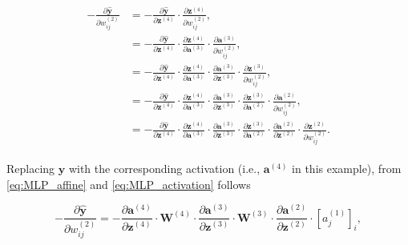 \begin{align}\label{eq:backprop_step2}
\begin{split}
    -\frac{\partial\mathbf{\hat y}}{\partial w_{ij}^{(2)}} &=
        -\frac{\partial \mathbf{\hat y}}{\partial \mathbf{z}^{(4)}} \cdot
        \frac{\partial \mathbf{z}^{(4)}}{\partial w_{ij}^{(2)}} ,\\
    &= -\frac{\partial \mathbf{\hat y}} {\partial \mathbf{z}^{(4)}} \cdot
        \frac{\partial \mathbf{z}^{(4)}}{\partial \mathbf{a}^{(3)}} \cdot
        \frac{\partial \mathbf{a}^{(3)}}{\partial w_{ij}^{(2)}} ,\\
    &= -\frac{\partial \mathbf{\hat y}} {\partial \mathbf{z}^{(4)}} \cdot
        \frac{\partial \mathbf{z}^{(4)}}{\partial \mathbf{a}^{(3)}} \cdot
        \frac{\partial \mathbf{a}^{(3)}}{\partial \mathbf{z}^{(3)}} \cdot
        \frac{\partial \mathbf{z}^{(3)}}{\partial w_{ij}^{(2)}} ,\\
    &= -\frac{\partial \mathbf{\hat y}} {\partial \mathbf{z}^{(4)}} \cdot
        \frac{\partial \mathbf{z}^{(4)}}{\partial \mathbf{a}^{(3)}} \cdot
        \frac{\partial \mathbf{a}^{(3)}}{\partial \mathbf{z}^{(3)}} \cdot
        \frac{\partial \mathbf{z}^{(3)}}{\partial \mathbf{a}^{(2)}} \cdot
        \frac{\partial \mathbf{a}^{(2)}}{\partial w_{ij}^{(2)}} ,\\
    &= -\frac{\partial \mathbf{\hat y}} {\partial \mathbf{z}^{(4)}} \cdot
        \frac{\partial \mathbf{z}^{(4)}}{\partial \mathbf{a}^{(3)}} \cdot
        \frac{\partial \mathbf{a}^{(3)}}{\partial \mathbf{z}^{(3)}} \cdot
        \frac{\partial \mathbf{z}^{(3)}}{\partial \mathbf{a}^{(2)}} \cdot
        \frac{\partial \mathbf{a}^{(2)}}{\partial \mathbf{z}^{(2)}} \cdot
        \frac{\partial \mathbf{z}^{(2)}}{\partial w_{ij}^{(2)}}.
\end{split}
\end{align}

Replacing $\mathbf{\hat y}$ with the corresponding activation
(i.e., $\mathbf{a}^{(4)}$ in this example), from \autoref{eq:MLP_affine} and
\autoref{eq:MLP_activation} follows

\begin{equation}\label{eq:backprop_step3}
    -\frac{\partial\mathbf{\hat y}}{\partial w_{ij}^{(2)}} =
       -\frac{\partial \mathbf{a}^{(4)}} {\partial \mathbf{z}^{(4)}} \cdot
        \mathbf{W}^{(4)} \cdot
        \frac{\partial \mathbf{a}^{(3)}}{\partial \mathbf{z}^{(3)}} \cdot
        \mathbf{W}^{(3)} \cdot
        \frac{\partial \mathbf{a}^{(2)}}{\partial \mathbf{z}^{(2)}} \cdot
        [a_{j}^{(1)}]_i,
\end{equation}

